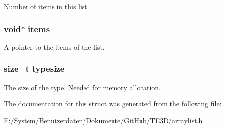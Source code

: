 Number of items in this list. 

\hypertarget{struct_array_list_aaf3a7f7e06149edc000a4a62ca99ec18}{
\subsubsection[{items}]{\setlength{\rightskip}{0pt plus 5cm}void$\ast$ items}}\label{struct_array_list_aaf3a7f7e06149edc000a4a62ca99ec18}


A pointer to the items of the list. 

\hypertarget{struct_array_list_aae15b6d77b58dbd6f21861d1320ec961}{
\subsubsection[{typesize}]{\setlength{\rightskip}{0pt plus 5cm}size\-\_\-t typesize}}\label{struct_array_list_aae15b6d77b58dbd6f21861d1320ec961}


The size of the type. Needed for memory allocation. 



The documentation for this struct was generated from the following file\-:\begin{DoxyCompactItemize}
\item 
E\-:/\-System/\-Benutzerdaten/\-Dokumente/\-Git\-Hub/\-T\-E3\-D/\hyperlink{arraylist_8h}{arraylist.\-h}\end{DoxyCompactItemize}
